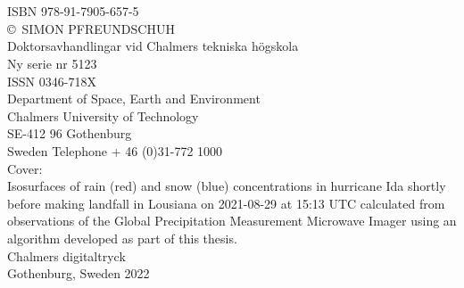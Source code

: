 \thispagestyle{plain}
\vspace*{5cm}

\noindent\textbf{\thetitle}\\[0.2cm]
%
 \theauthor \\
ISBN 978-91-7905-657-5\\[0.5cm]

\noindent \copyright \ {\sc SIMON PFREUNDSCHUH} \\[0.5cm]



\noindent Doktorsavhandlingar vid Chalmers tekniska högskola \\
Ny serie nr 5123  \\
ISSN 0346-718X  \\[0.5cm]

\noindent Department of Space, Earth and Environment \\
Chalmers University of Technology  \\
SE-412 96 Gothenburg  \\
Sweden 
Telephone + 46 (0)31-772 1000  \\[2cm]

\vfill \noindent Cover:  \\
\noindent Isosurfaces of rain (red) and snow (blue) concentrations in hurricane Ida shortly before making
landfall in Lousiana on 2021-08-29 at 15:13 UTC calculated from observations of
the Global Precipitation Measurement Microwave Imager using an algorithm
developed as part of this thesis.
 \\[0.5cm]

\noindent Chalmers digitaltryck  \\
\noindent Gothenburg, Sweden 2022 

\clearpage

